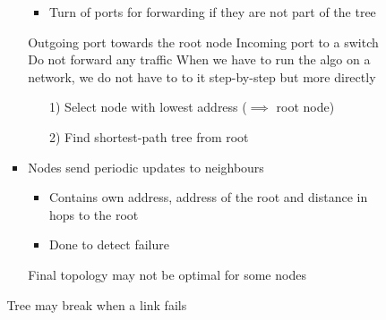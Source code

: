 \begin{itemize}
\begin{itemize}
\begin{itemize}
\begin{itemize}
\begin{itemize}
                                    \item Turn of ports for forwarding if they are not part of the tree
                                \end{itemize}
                             Outgoing port towards the root node
                             Incoming port to a switch
                             Do not forward any traffic
                             When we have to run the algo on a network, we do not have to to it step-by-step but more directly
                                \begin{itemize}
                                    \item[1)] Select node with lowest address ($\implies$ root node)
                                    \item[2)] Find shortest-path tree from root
                                \end{itemize}
                            \item Nodes send periodic updates to neighbours
                                \begin{itemize}
                                    \item Contains own address, address of the root and distance in hops to the root
                                    \item Done to detect failure
                                \end{itemize}
                            \icon Final topology may not be optimal for some nodes
                        \end{itemize}
                    \icon Tree may break when a link fails
                \end{itemize}
        \end{itemize}
\end{itemize}

